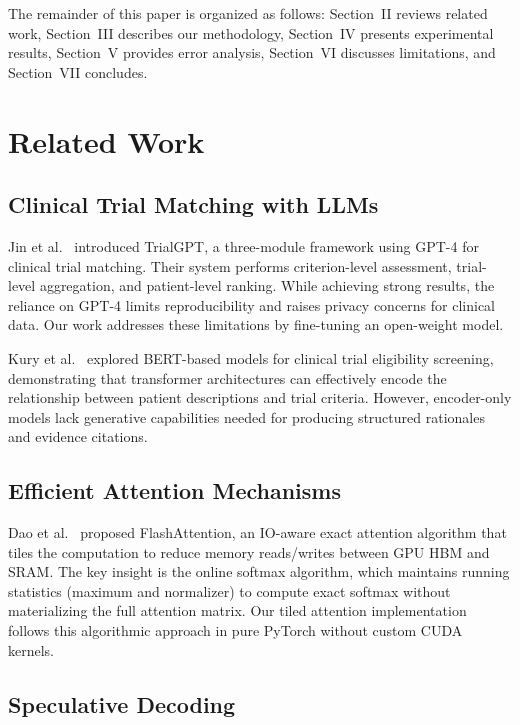 \documentclass[conference]{IEEEtran}
\begin{document}
The remainder of this paper is organized as follows: Section~II reviews related work, Section~III describes our methodology, Section~IV presents experimental results, Section~V provides error analysis, Section~VI discusses limitations, and Section~VII concludes.

\section{Related Work}

\subsection{Clinical Trial Matching with LLMs}

Jin et al.~\cite{jin2024trialgpt} introduced TrialGPT, a three-module framework using GPT-4 for clinical trial matching. Their system performs criterion-level assessment, trial-level aggregation, and patient-level ranking. While achieving strong results, the reliance on GPT-4 limits reproducibility and raises privacy concerns for clinical data. Our work addresses these limitations by fine-tuning an open-weight model.

Kury et al.~\cite{kury2023clinical} explored BERT-based models for clinical trial eligibility screening, demonstrating that transformer architectures can effectively encode the relationship between patient descriptions and trial criteria. However, encoder-only models lack generative capabilities needed for producing structured rationales and evidence citations.

\subsection{Efficient Attention Mechanisms}

Dao et al.~\cite{dao2022flashattention} proposed FlashAttention, an IO-aware exact attention algorithm that tiles the computation to reduce memory reads/writes between GPU HBM and SRAM. The key insight is the online softmax algorithm, which maintains running statistics (maximum and normalizer) to compute exact softmax without materializing the full attention matrix. Our tiled attention implementation follows this algorithmic approach in pure PyTorch without custom CUDA kernels.

\subsection{Speculative Decoding}
\end{document}
